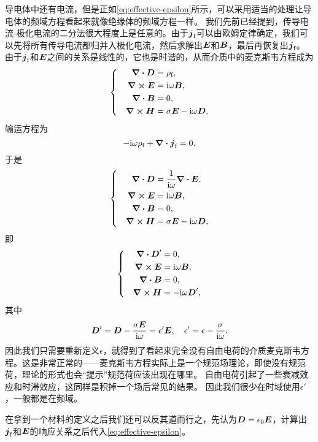 \documentclass[UTF8, a4paper]{ctexart}
\newcommand*{\ii}{\mathrm{i}}
\newenvironment{bigcase}{\left\{\quad\begin{aligned}}{\end{aligned}\right.}
\begin{document}
导电体中还有电流，但是正如\eqref{eq:effective-epsilon}所示，可以采用适当的处理让导电体的频域方程看起来就像绝缘体的频域方程一样。
我们先前已经提到，传导电流-极化电流的二分法很大程度上是任意的。由于$\vb*{j}_\text{f}$可以由欧姆定律确定，我们可以先将所有传导电流都归并入极化电流，然后求解出$\vb*{E}$和$\vb*{B}$，最后再恢复出$\vb*{j}_\text{f}$。
由于$\vb*{j}_\text{f}$和$\vb*{E}$之间的关系是线性的，它也是时谐的，从而介质中的麦克斯韦方程成为
\[
    \begin{bigcase}
        \div{\vb*{D}} &= \rho_\text{f}, \\
        \curl{\vb*{E}} &= \ii \omega \vb*{B}, \\
        \div{\vb*{B}} &= 0, \\
        \curl{\vb*{H}} &= \sigma \vb*{E} - \ii \omega \vb*{D},
    \end{bigcase}
\]
输运方程为
\[
    -\ii \omega \rho_\text{f} + \div{\vb*{j}_\text{f}} = 0,
\]
于是
\[
    \begin{bigcase}
        \div{\vb*{D}} &= \frac{1}{\ii \omega} \div{\vb*{E}}, \\
        \curl{\vb*{E}} &= \ii \omega \vb*{B}, \\
        \div{\vb*{B}} &= 0, \\
        \curl{\vb*{H}} &= \sigma \vb*{E} - \ii \omega \vb*{D},
    \end{bigcase}
\]
即
\begin{equation}
    \begin{bigcase}
        \div{\vb*{D}'} &= 0, \\
        \curl{\vb*{E}} &= \ii \omega \vb*{B}, \\
        \div{\vb*{B}} &= 0, \\
        \curl{\vb*{H}} &= - \ii \omega \vb*{D}', 
    \end{bigcase}
\end{equation}
其中
\begin{equation}
    \vb*{D}' = \vb*{D} - \frac{\sigma \vb*{E}}{\ii \omega} = \epsilon' \vb*{E}, \quad \epsilon' = \epsilon - \frac{\sigma}{\ii \omega}.
    \label{eq:effective-epsilon}
\end{equation}
因此我们只需要重新定义$\epsilon$，就得到了看起来完全没有自由电荷的介质麦克斯韦方程。这是非常正常的——麦克斯韦方程实际上是一个规范场理论，即使没有规范荷，理论的形式也会“提示”规范荷应该出现在哪里。
自由电荷引起了一些衰减效应和时滞效应，这同样是积掉一个场后常见的结果。
因此我们很少在时域使用$\epsilon'$，一般都是在频域。

在拿到一个材料的定义之后我们还可以反其道而行之，先认为$\vb*{D} = \epsilon_0 \vb*{E}$，计算出$\vb*{j}_\text{f}$和$\vb*{E}$的响应关系之后代入\eqref{eq:effective-epsilon}。
\end{document}
